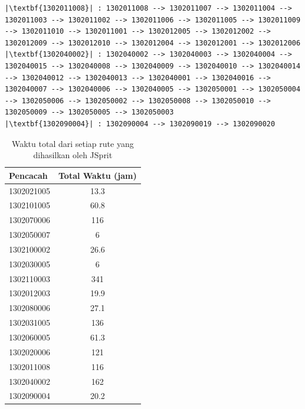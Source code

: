 \begin{listing}[!]
\begin{verbatim}
|\textbf{1302011008}| : 1302011008 --> 1302011007 --> 1302011004 --> 1302011003 --> 1302011002 --> 1302011006 --> 1302011005 --> 1302011009 --> 1302011010 --> 1302011001 --> 1302012005 --> 1302012002 --> 1302012009 --> 1302012010 --> 1302012004 --> 1302012001 --> 1302012006
|\textbf{1302040002}| : 1302040002 --> 1302040003 --> 1302040004 --> 1302040015 --> 1302040008 --> 1302040009 --> 1302040010 --> 1302040014 --> 1302040012 --> 1302040013 --> 1302040001 --> 1302040016 --> 1302040007 --> 1302040006 --> 1302040005 --> 1302050001 --> 1302050004 --> 1302050006 --> 1302050002 --> 1302050008 --> 1302050010 --> 1302050009 --> 1302050005 --> 1302050003
|\textbf{1302090004}| : 1302090004 --> 1302090019 --> 1302090020
	\end{verbatim}
\end{listing}


\begin{table}[!]
	\centering
	\captionsetup{format=hang}
	\caption{Waktu total dari setiap rute yang dihasilkan oleh JSprit}
	\label{tbl:enumerators_total_time}
	\begin{tabular}{lc}
		\toprule
		Pencacah & Total Waktu (jam)\\
		\midrule
		1302021005 & 13.3\\
		1302101005 & 60.8\\
		1302070006 & 116\\
		1302050007 & 6\\
		1302100002 & 26.6\\
		1302030005 & 6\\
		1302110003 & 341\\
		1302012003 & 19.9\\
		1302080006 & 27.1\\
		1302031005 & 136\\
		1302060005 & 61.3\\
		1302020006 & 121\\
		1302011008 & 116\\
		1302040002 & 162\\
		1302090004 & 20.2\\
		\bottomrule
	\end{tabular}
\end{table}


